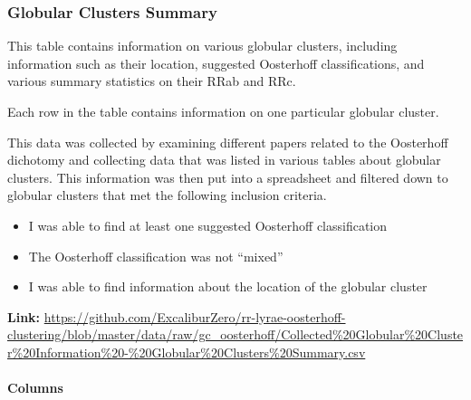 \documentclass[]{article}
\begin{document}
\subsubsection{Globular Clusters Summary}

This table contains information on various globular clusters, including information such as their location, suggested Oosterhoff classifications, and various summary statistics on their RRab and RRc.

\vspace{12pt}

Each row in the table contains information on one particular globular cluster.

\vspace{12pt}

This data was collected by examining different papers related to the Oosterhoff dichotomy and collecting data that was listed in various tables about globular clusters. This information was then put into a spreadsheet and filtered down to globular clusters that met the following inclusion criteria.

\begin{itemize}
	\item I was able to find at least one suggested Oosterhoff classification
	\item The Oosterhoff classification was not ``mixed''
	\item I was able to find information about the location of the globular cluster
\end{itemize}

\textbf{Link:} \url{https://github.com/ExcaliburZero/rr-lyrae-oosterhoff-clustering/blob/master/data/raw/gc_oosterhoff/Collected\%20Globular\%20Cluster\%20Information\%20-\%20Globular\%20Clusters\%20Summary.csv}

\paragraph{Columns}
\end{document}
